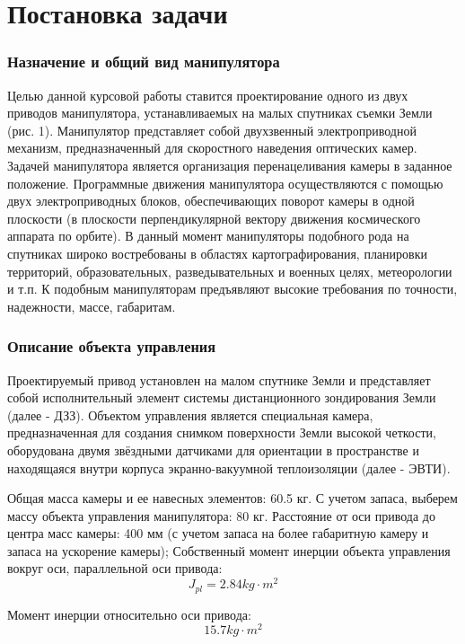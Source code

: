 \newpage
\part{Постановка задачи}
\section{Назначение и общий вид манипулятора}
Целью данной курсовой работы ставится проектирование одного из двух 
приводов манипулятора, устанавливаемых на малых спутниках съемки Земли (рис. 1).
Манипулятор представляет собой двухзвенный электроприводной механизм,
предназначенный для скоростного наведения оптических камер. Задачей манипулятора 
является организация перенацеливания камеры в заданное положение. Программные 
движения манипулятора осуществляются с помощью двух электроприводных блоков,
обеспечивающих поворот камеры в одной плоскости (в плоскости перпендикулярной
вектору движения космического аппарата по орбите).
В данный момент манипуляторы подобного рода на спутниках широко востребованы 
в областях картографирования, планировки территорий, образовательных, 
разведывательных и военных целях, метеорологии и т.п. 
К подобным манипуляторам предъявляют высокие требования по точности,
надежности, массе, габаритам.

\section{Описание объекта управления}
Проектируемый привод установлен на малом спутнике Земли и представляет собой 
исполнительный элемент системы дистанционного зондирования Земли (далее - ДЗЗ).
Объектом управления является специальная камера, предназначенная для создания 
снимком поверхности Земли высокой четкости, оборудована двумя звёздными 
датчиками для ориентации в пространстве и находящаяся внутри корпуса
экранно-вакуумной теплоизоляции (далее - ЭВТИ).

Общая масса камеры и ее навесных элементов: 60.5 кг. С учетом запаса, выберем
массу объекта управления манипулятора: 80 кг.
Расстояние от оси привода до центра масс камеры: 400 мм (с учетом запаса 
на более габаритную камеру и запаса на ускорение камеры);
Собственный момент инерции объекта управления вокруг оси, параллельной оси привода: 
$$
    J_{pl} = 2.84 kg \cdot m^2
$$

Момент инерции относительно оси привода:
$$
    15.7 kg \cdot m^2
$$


